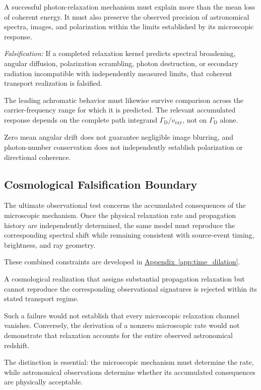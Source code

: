 \begin{itemize}
A successful photon-relaxation mechanism must explain
more than the mean loss of coherent energy. It must
also preserve the observed precision of astronomical
spectra, images, and polarization within the limits
established by its microscopic response.

\textit{Falsification:} If a completed relaxation
kernel predicts spectral broadening, angular diffusion,
polarization scrambling, photon destruction, or
secondary radiation incompatible with independently
measured limits, that coherent transport realization
is falsified.

The leading achromatic behavior must likewise survive
comparison across the carrier-frequency range for
which it is predicted. The relevant accumulated
response depends on the complete path integrand
$\Gamma_{\mathrm D}/v_{\mathrm{ray}}$, not on
$\Gamma_{\mathrm D}$ alone.

Zero mean angular drift does not guarantee negligible
image blurring, and photon-number conservation does
not independently establish polarization or
directional coherence.

\end{itemize}

\subsection*{Cosmological Falsification Boundary}

The ultimate observational test concerns the accumulated
consequences of the microscopic mechanism. Once the
physical relaxation rate and propagation history are
independently determined, the same model must reproduce
the corresponding spectral shift while remaining
consistent with source-event timing, brightness, and
ray geometry.

These combined constraints are developed in
\hyperref[app:time_dilation]{Appendix~\ref*{app:time_dilation}}.

A cosmological realization that assigns substantial
propagation relaxation but cannot reproduce the
corresponding observational signatures is rejected
within its stated transport regime.

Such a failure would not establish that every
microscopic relaxation channel vanishes. Conversely,
the derivation of a nonzero microscopic rate would
not demonstrate that relaxation accounts for the
entire observed astronomical redshift.

The distinction is essential: the microscopic
mechanism must determine the rate, while
astronomical observations determine whether its
accumulated consequences are physically acceptable.

